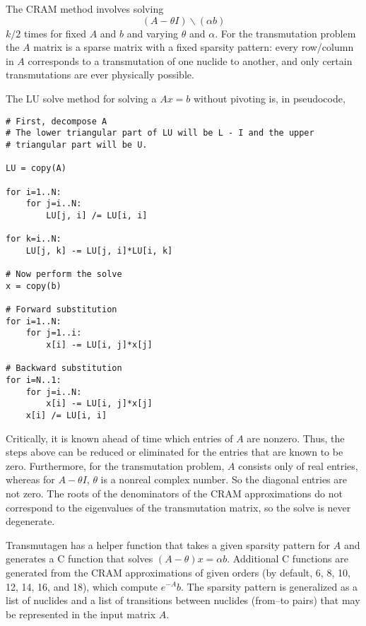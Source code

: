 The CRAM method involves solving
\begin{equation}
 (A - \theta I)\backslash(\alpha b)
\end{equation}
$k/2$ times for fixed $A$ and $b$ and varying $\theta$ and $\alpha$. For the
transmutation problem the $A$ matrix is a sparse matrix with a fixed sparsity
pattern: every row/column in $A$ corresponds to a transmutation of one nuclide
to another, and only certain transmutations are ever physically possible.

The LU solve method for solving a $Ax=b$ without pivoting is, in pseudocode,

\begin{verbatim}
# First, decompose A
# The lower triangular part of LU will be L - I and the upper
# triangular part will be U.

LU = copy(A)

for i=1..N:
    for j=i..N:
        LU[j, i] /= LU[i, i]

for k=i..N:
    LU[j, k] -= LU[j, i]*LU[i, k]

# Now perform the solve
x = copy(b)

# Forward substitution
for i=1..N:
    for j=1..i:
        x[i] -= LU[i, j]*x[j]

# Backward substitution
for i=N..1:
    for j=i..N:
        x[i] -= LU[i, j]*x[j]
    x[i] /= LU[i, i]
\end{verbatim}

Critically, it is known ahead of time which entries of $A$ are nonzero. Thus,
the steps above can be reduced or eliminated for the entries that are known to
be zero. Furthermore, for the transmutation problem, $A$ consists only of real
entries, whereas for $A - \theta I$, $\theta$ is a nonreal complex number. So
the diagonal entries are not zero. The roots of the denominators of the CRAM
approximations do not correspond to the eigenvalues of the transmutation
matrix, so the solve is never degenerate.

Transmutagen has a helper function that takes a given sparsity pattern for $A$
and generates a C function that solves $(A - \theta)x =\alpha b$. Additional C
functions are generated from the CRAM approximations of given orders (by
default, 6, 8, 10, 12, 14, 16, and 18), which compute $e^{-A}b$. The sparsity
pattern is generalized as a list of nuclides and a list of transitions between
nuclides (from--to pairs) that may be represented in the input matrix $A$.
